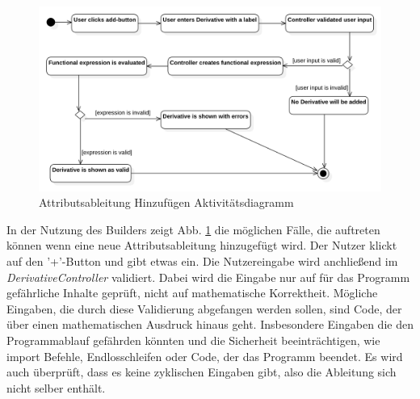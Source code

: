 \documentclass{article}
\begin{document}
\begin{figure}[H]%
    \centering
    \includegraphics[width=13cm]{entwurf/Floriane/AktivityAddDerivative.png}
    \caption{Attributsableitung Hinzufügen Aktivitätsdiagramm}
    \label{fig:ad:AddDerivative}
\end{figure}
In der Nutzung des Builders zeigt Abb. \ref{fig:ad:AddDerivative} die möglichen Fälle, die auftreten können wenn eine neue Attributsableitung hinzugefügt wird. Der Nutzer klickt auf den '+'-Button und gibt etwas ein. Die Nutzereingabe wird anchließend im \textit{DerivativeController} validiert. Dabei wird die Eingabe nur auf für das Programm gefährliche Inhalte geprüft, nicht auf mathematische Korrektheit. Mögliche Eingaben, die durch diese Validierung abgefangen werden sollen, sind Code, der über einen mathematischen Ausdruck hinaus geht. Insbesondere Eingaben die den Programmablauf gefährden könnten und die Sicherheit beeinträchtigen, wie import Befehle, Endlosschleifen oder Code, der das Programm beendet. Es wird auch überprüft, dass es keine zyklischen Eingaben gibt, also die Ableitung sich nicht selber enthält.
\end{document}
